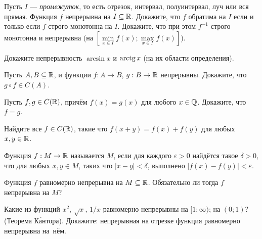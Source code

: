 \documentclass[a4paper,12pt]{article}
\begin{document}
 Пусть $I$ --- {\em промежуток}, то есть отрезок, интервал, полуинтервал, луч или вся прямая.
Функция $f$ непрерывна на $I\subseteq\mathbb{R}$. Докажите, что $f$ обратима на $I$ если и только если
$f$ строго монотонна на $I$. Докажите, что при этом
$f^{-1}$
строго монотонна и непрерывна (на %
$[\min\limits_{x\in I} f(x);\max\limits_{x\in I} f(x)]$).

 Докажите непрерывность %
$\arcsin x$ и $\arctg x$
(на их области определения).



Пусть $A,B\subseteq\mathbb{R}$, и функции $f:A\rightarrow B$, $g:B\rightarrow\mathbb{R}$
непрерывны. Докажите, что %
$g\circ f\in C(A)$.



Пусть $f,g\in C(\mathbb{R})$, прич\"ем $f(x)=g(x)$ для
любого $x\in\mathbb{Q}$. Докажите, что %
$f=g$.

Найдите все $f\in C(\mathbb{R})$, %
такие что
$f(x+y)=f(x)+f(y)$ для любых $x,y\in\mathbb{R}$.


Функция $f:M\rightarrow\mathbb{R}$ %
называется  %
$M$, если для каждого $\varepsilon>0$ найд\"ется такое $\delta>0$, что
для любых $x,y\in M$,
таких что $|x-y|<\delta$,
выполнено %
$|f(x)-f(y)|<\varepsilon$.

Функция $f$ равномерно непрерывна на $M\subseteq\mathbb{R}$.
Обязательно ли тогда $f$ непрерывна на $M$?


Какие из %
функций $x^2$, $\sqrt x$, $1/x$ равномерно непрерывны
на $[1;\infty)$;
на $(0;1)$?
%
%
{\small\sc (Теорема К\'антора).}
Докажите: непрерывная на отрезке функция равномерно непрерывна на~н\"ем.




\end{document}
